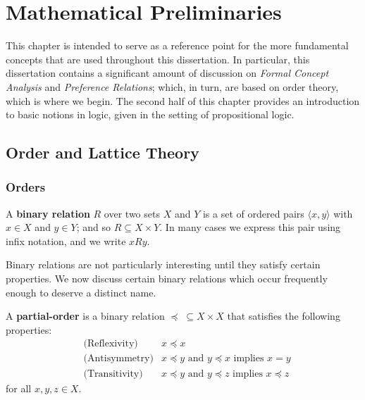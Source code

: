 \chapter{Mathematical Preliminaries}
\label{chapter:mathematical-preliminaries}

This chapter is intended to serve as a reference point for the more fundamental concepts that are used throughout this dissertation. In particular, this dissertation contains a significant amount of  discussion on \textit{Formal Concept Analysis} and \textit{Preference Relations}; which, in turn, are based on order theory, which is where we begin. The second half of this chapter provides an introduction to basic notions in logic, given in the setting of propositional logic.

\section{Order and Lattice Theory}
\label{section:order-theory}

\subsection{Orders}
\label{subsection:orders}

\begin{definition}
  \label{definition:binary-relation}
  A \textbf{binary relation}  $R$ over two sets $X$ and $Y$ is a set of ordered pairs $\langle x,y \rangle$ with $x \in X$ and $y \in Y$; and so $R \subseteq X \times Y$. In many cases we express this pair using infix notation, and we write $xRy$.
\end{definition}

Binary relations are not particularly interesting until they satisfy certain properties. We now discuss certain binary relations which occur frequently enough to deserve a distinct name.

\begin{definition}
  \label{definition:partial-order}
  A \textbf{partial-order}  is a binary relation $\preceq \; \subseteq X \times X$ that satisfies the following properties:
  \begin{align}
    & \text{(Reflexivity)} & x \preceq x \\
    & \text{(Antisymmetry)} & x \preceq y \text{ and } y \preceq x \text{ implies } x = y \\
    & \text{(Transitivity)} & x \preceq y \text{ and } y \preceq z \text{ implies } x \preceq z
  \end{align}
  for all $x,y,z \in X$.
\end{definition}

